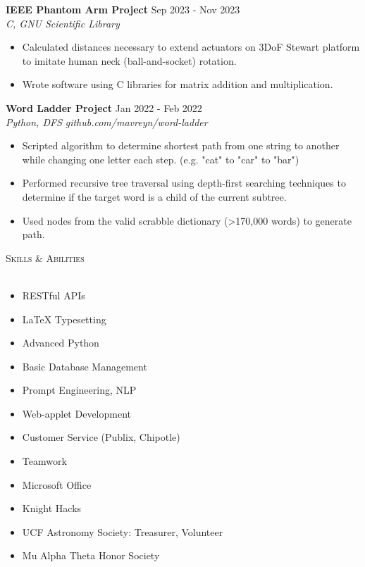 \documentclass[letterpaper]{article}
\newcommand{\lineunder} {
    \vspace*{-8pt} \\
    \hspace*{-18pt} \hrulefill \\
}
\newcommand{\header} [1] {
    {\hspace*{-18pt}\vspace*{12pt} \large\textsc{#1}}
    \vspace*{-12pt} \lineunder
}
\begin{document}
\textbf{IEEE Phantom Arm Project} \hfill Sep 2023 - Nov 2023\\
\textit{C, GNU Scientific Library} \\
\vspace{-1mm}
\begin{itemize} \itemsep 1pt
	\item Calculated distances necessary to extend actuators on 3DoF Stewart platform to imitate human neck (ball-and-socket) rotation.
	\item Wrote software using C libraries for matrix addition and multiplication.
\end{itemize}

\textbf{Word Ladder Project} \hfill Jan 2022 - Feb 2022\\
\textit{Python, DFS} \hfill \textit{github.com/mavreyn/word-ladder}\\
\vspace{-1mm}
\begin{itemize} \itemsep 1pt
	\item Scripted algorithm to determine shortest path from one string to another while changing one letter each step. (e.g. "cat" to "car" to "bar")
	\item Performed recursive tree traversal using depth-first searching techniques to determine if the target word is a child of the current subtree.
    \item Used nodes from the valid scrabble dictionary (>170,000 words) to generate path.
\end{itemize}

\vspace{2mm}


\header{Skills \& Abilities}
\begin{multicols}{2}
    \begin{itemize} \itemsep 1pt
        \item RESTful APIs
        \item LaTeX Typesetting
        \item Advanced Python
        \item Basic Database Management
        \item Prompt Engineering, NLP
        \item Web-applet Development
        \item Customer Service (Publix, Chipotle)
        \item Teamwork
        \item Microsoft Office
        \item Knight Hacks
        \item UCF Astronomy Society: Treasurer, Volunteer
        \item Mu Alpha Theta Honor Society
    \end{itemize}
\end{multicols}
\end{document}
